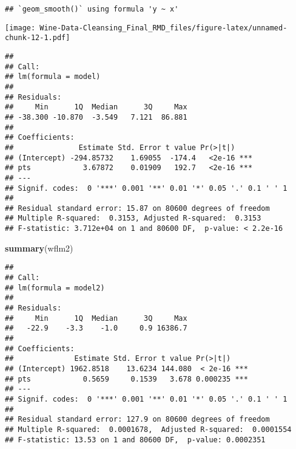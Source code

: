 \documentclass[
]{article}
\newenvironment{Shaded}{\begin{snugshade}}{\end{snugshade}}
\newcommand{\KeywordTok}[1]{\textcolor[rgb]{0.13,0.29,0.53}{\textbf{#1}}}
\newcommand{\NormalTok}[1]{#1}
\newcommand{\OperatorTok}[1]{\textcolor[rgb]{0.81,0.36,0.00}{\textbf{#1}}}
\newcommand{\StringTok}[1]{\textcolor[rgb]{0.31,0.60,0.02}{#1}}
\begin{document}
\begin{verbatim}
## `geom_smooth()` using formula 'y ~ x'
\end{verbatim}

\texttt{[image: Wine-Data-Cleansing\_Final\_RMD\_files/figure-latex/unnamed-chunk-12-1.pdf]}

\begin{Shaded}
\end{Shaded}

\begin{verbatim}
## 
## Call:
## lm(formula = model)
## 
## Residuals:
##     Min      1Q  Median      3Q     Max 
## -38.300 -10.870  -3.549   7.121  86.881 
## 
## Coefficients:
##               Estimate Std. Error t value Pr(>|t|)    
## (Intercept) -294.85732    1.69055  -174.4   <2e-16 ***
## pts            3.67872    0.01909   192.7   <2e-16 ***
## ---
## Signif. codes:  0 '***' 0.001 '**' 0.01 '*' 0.05 '.' 0.1 ' ' 1
## 
## Residual standard error: 15.87 on 80600 degrees of freedom
## Multiple R-squared:  0.3153, Adjusted R-squared:  0.3153 
## F-statistic: 3.712e+04 on 1 and 80600 DF,  p-value: < 2.2e-16
\end{verbatim}

\begin{Shaded}
\begin{Highlighting}[]
\KeywordTok{summary}\NormalTok{(wflm2)}
\end{Highlighting}
\end{Shaded}

\begin{verbatim}
## 
## Call:
## lm(formula = model2)
## 
## Residuals:
##     Min      1Q  Median      3Q     Max 
##   -22.9    -3.3    -1.0     0.9 16386.7 
## 
## Coefficients:
##              Estimate Std. Error t value Pr(>|t|)    
## (Intercept) 1962.8518    13.6234 144.080  < 2e-16 ***
## pts            0.5659     0.1539   3.678 0.000235 ***
## ---
## Signif. codes:  0 '***' 0.001 '**' 0.01 '*' 0.05 '.' 0.1 ' ' 1
## 
## Residual standard error: 127.9 on 80600 degrees of freedom
## Multiple R-squared:  0.0001678,  Adjusted R-squared:  0.0001554 
## F-statistic: 13.53 on 1 and 80600 DF,  p-value: 0.0002351
\end{verbatim}
\end{document}
